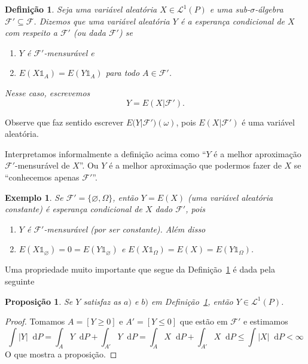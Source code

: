 \documentclass[reqno, draft]{book}
\newcommand*\1{\mathds{1}}
\newtheorem{proposition}[theorem]{Proposição}
\newtheorem{definition}[theorem]{Definição}
\newtheorem{example}{Exemplo}[section]
\renewcommand*\d{\mathop{}\!\mathrm{d}}
\begin{document}
\begin{definition}
  \label{d:esperanca_condicional}
  Seja uma variável aleatória $X \in \mathcal{L}^1(P)$ e uma sub-$\sigma$-álgebra $\mathcal{F}' \subseteq \mathcal{F}$.
  Dizemos que uma variável aleatória $Y$ é a esperança condicional  de $X$ com respeito a $\mathcal{F}'$ (ou dada $\mathcal{F}'$) se
  \begin{enumerate}[\quad a)]
  \item $Y$ é $\mathcal{F}'$-mensurável e
  \item $E(X \1_{A}) = E(Y \1_{A})$ para todo $A \in \mathcal{F}'$.
  \end{enumerate}
  Nesse caso, escrevemos
  \begin{equation}
    Y = E(X | \mathcal{F}').
  \end{equation}
\end{definition}

Observe que faz sentido escrever $E\big(Y|\mathcal{F}'\big)(\omega)$, pois $E(X|\mathcal{F}')$ é uma variável aleatória.

Interpretamos informalmente a definição acima como ``$Y$ é a melhor aproximação $\mathcal{F}'$-mensurável de $X$''.
Ou $Y$ é a melhor aproximação que podermos fazer de $X$ se ``conhecemos apenas $\mathcal{F}'$''.

\begin{example}
  \label{x:EXF_trivial}
  Se $\mathcal{F}' = \{\varnothing, \Omega\}$, então $Y = E(X)$ (uma variável aleatória constante) é esperança condicional de $X$ dado $\mathcal{F}'$, pois
  \begin{enumerate}[\quad a)]
  \item $Y$ é $\mathcal{F}'$-mensurável (por ser constante). Além disso
  \item $E(X \1_\varnothing) = 0 = E(Y \1_\varnothing)$ e $E(X \1_\Omega) = E(X) = E(Y \1_\Omega)$.
  \end{enumerate}
\end{example}

Uma propriedade muito importante que segue da Definição~\ref{d:esperanca_condicional} é dada pela seguinte

\begin{proposition}
  \label{p:ec_em_L1}
  Se $Y$ satisfaz as $a)$ e $b)$ em Definição~\ref{d:esperanca_condicional}, então $Y \in \mathcal{L}^1(P)$.
\end{proposition}

\begin{proof}
  Tomamos $A = [Y \geq 0]$ e $A' = [Y \leq 0]$ que estão em $\mathcal{F}'$ e estimamos
  \begin{equation}
    \int |Y| \d P = \int_A Y \d P + \int_{A'} Y \d P = \int_A X \d P + \int_{A'} X \d P \leq \int |X| \d P < \infty
  \end{equation}
  O que mostra a proposição.
\end{proof}
\end{document}
